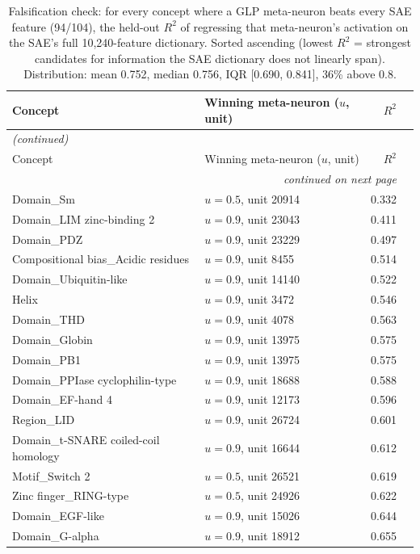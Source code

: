 \documentclass{article}
\begin{document}
\begin{longtable}{p{6.2cm}p{1.6cm}rr}
\caption{Falsification check: for every concept where a GLP meta-neuron beats every SAE feature (94/104), the held-out $R^2$ of regressing that meta-neuron's activation on the SAE's full 10{,}240-feature dictionary. Sorted ascending (lowest $R^2$ = strongest candidates for information the SAE dictionary does not linearly span). Distribution: mean 0.752, median 0.756, IQR [0.690, 0.841], 36\% above 0.8.} \label{tab:app-falsification} \\
\toprule
Concept & Winning meta-neuron ($u$, unit) & $R^2$ \\
\midrule
\endfirsthead
\multicolumn{3}{l}{\textit{(continued)}} \\
\toprule
Concept & Winning meta-neuron ($u$, unit) & $R^2$ \\
\midrule
\endhead
\midrule \multicolumn{3}{r}{\textit{continued on next page}} \\
\endfoot
\bottomrule
\endlastfoot
Domain\_Sm & $u{=}0.5$, unit 20914 & 0.332 \\
Domain\_LIM zinc-binding 2 & $u{=}0.9$, unit 23043 & 0.411 \\
Domain\_PDZ & $u{=}0.9$, unit 23229 & 0.497 \\
Compositional bias\_Acidic residues & $u{=}0.9$, unit 8455 & 0.514 \\
Domain\_Ubiquitin-like & $u{=}0.9$, unit 14140 & 0.522 \\
Helix & $u{=}0.9$, unit 3472 & 0.546 \\
Domain\_THD & $u{=}0.9$, unit 4078 & 0.563 \\
Domain\_Globin & $u{=}0.9$, unit 13975 & 0.575 \\
Domain\_PB1 & $u{=}0.9$, unit 13975 & 0.575 \\
Domain\_PPIase cyclophilin-type & $u{=}0.9$, unit 18688 & 0.588 \\
Domain\_EF-hand 4 & $u{=}0.9$, unit 12173 & 0.596 \\
Region\_LID & $u{=}0.9$, unit 26724 & 0.601 \\
Domain\_t-SNARE coiled-coil homology & $u{=}0.9$, unit 16644 & 0.612 \\
Motif\_Switch 2 & $u{=}0.5$, unit 26521 & 0.619 \\
Zinc finger\_RING-type & $u{=}0.5$, unit 24926 & 0.622 \\
Domain\_EGF-like & $u{=}0.9$, unit 15026 & 0.644 \\
Domain\_G-alpha & $u{=}0.9$, unit 18912 & 0.655 \\

\end{longtable}
\end{document}
